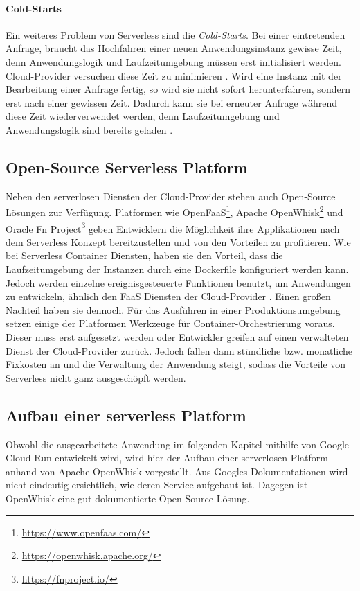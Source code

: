 \paragraph{Cold-Starts} Ein weiteres Problem von Serverless sind die \emph{Cold-Starts}.
Bei einer eintretenden Anfrage, braucht das Hochfahren einer neuen Anwendungsinstanz
gewisse Zeit, denn Anwendungslogik und Laufzeitumgebung müssen erst initialisiert werden.
Cloud-Provider versuchen diese Zeit zu minimieren \cite{Firecracker}. Wird eine Instanz mit der Bearbeitung einer Anfrage
fertig, so wird sie nicht sofort herunterfahren, sondern erst nach einer gewissen Zeit.
Dadurch kann sie bei erneuter Anfrage während diese Zeit wiederverwendet werden, denn Laufzeitumgebung und
Anwendungslogik sind bereits geladen \cite{ColdStartComp}.

\subsection{Open-Source Serverless Platform}

Neben den serverlosen Diensten der Cloud-Provider stehen
auch Open-Source Lösungen zur Verfügung. Platformen wie
OpenFaaS\footnote{\url{https://www.openfaas.com/}},
Apache OpenWhisk\footnote{\url{https://openwhisk.apache.org/}} und
Oracle Fn Project\footnote{\url{https://fnproject.io/}} geben
Entwicklern die Möglichkeit ihre Applikationen
nach dem Serverless Konzept bereitzustellen und
von den Vorteilen zu profitieren. Wie bei Serverless
Container Diensten, haben sie den Vorteil,
dass die Laufzeitumgebung der Instanzen durch
eine Dockerfile konfiguriert werden kann.
Jedoch werden einzelne ereignisgesteuerte Funktionen benutzt,
um Anwendungen zu entwickeln, ähnlich den FaaS Diensten der
Cloud-Provider \cite{OpenFaasGithub} \cite{OpenWhiskGithub}.
Einen großen Nachteil haben sie dennoch.
Für das Ausführen in einer Produktionsumgebung setzen einige
der Platformen Werkzeuge für Container-Orchestrierung voraus.
Dieser muss erst aufgesetzt werden oder Entwickler greifen auf
einen verwalteten Dienst der Cloud-Provider zurück. Jedoch fallen
dann stündliche bzw. monatliche Fixkosten an und die
Verwaltung der Anwendung steigt, sodass die Vorteile
von Serverless nicht ganz ausgeschöpft werden.

\subsection{Aufbau einer serverless Platform}
Obwohl die ausgearbeitete Anwendung im folgenden Kapitel
mithilfe von Google Cloud Run entwickelt wird,
wird hier der Aufbau einer serverlosen Platform
anhand von Apache OpenWhisk vorgestellt.
Aus Googles Dokumentationen wird nicht eindeutig ersichtlich, wie
deren Service aufgebaut ist. Dagegen ist OpenWhisk eine
gut dokumentierte Open-Source Lösung.

